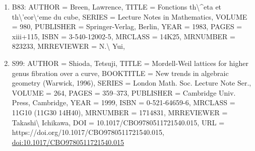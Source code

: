 \documentclass[11pt]{article}
\begin{document}
\begin{enumerate}[leftmargin=*]
  \item B83: AUTHOR = Breen, Lawrence, TITLE = Fonctions th\textbackslash{}\^{}eta et th\textbackslash{}'eor\textbackslash{}`eme du cube, SERIES = Lecture Notes in Mathematics, VOLUME = 980, PUBLISHER = Springer-Verlag, Berlin, YEAR = 1983, PAGES = xiii+115, ISBN = 3-540-12002-5, MRCLASS = 14K25, MRNUMBER = 823233, MRREVIEWER = N.\textbackslash{} Yui,
  \item S99: AUTHOR = Shioda, Tetsuji, TITLE = Mordell-Weil lattices for higher genus fibration over a curve, BOOKTITLE = New trends in algebraic geometry (Warwick, 1996), SERIES = London Math. Soc. Lecture Note Ser., VOLUME = 264, PAGES = 359--373, PUBLISHER = Cambridge Univ. Press, Cambridge, YEAR = 1999, ISBN = 0-521-64659-6, MRCLASS = 11G10 (11G30 14H40), MRNUMBER = 1714831, MRREVIEWER = Takashi\textbackslash{} Ichikawa, DOI = 10.1017/CBO9780511721540.015, URL = https://doi.org/10.1017/CBO9780511721540.015, \href{https://doi.org/10.1017/CBO9780511721540.015}{doi:10.1017/CBO9780511721540.015}
\end{enumerate}

% 
% 
\end{document}
